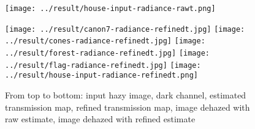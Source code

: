 \documentclass{article}
\begin{document}
\begin{figure}[H]
\begin{minipage}[b]{\linewidth}
        \texttt{[image: ../result/house-input-radiance-rawt.png]}
    \end{minipage}
    \begin{minipage}[b]{\linewidth}
        \centering
        \texttt{[image: ../result/canon7-radiance-refinedt.jpg]}
        \texttt{[image: ../result/cones-radiance-refinedt.jpg]}
        \texttt{[image: ../result/forest-radiance-refinedt.jpg]}
        \texttt{[image: ../result/flag-radiance-refinedt.jpg]}
        \texttt{[image: ../result/house-input-radiance-refinedt.png]}
    \end{minipage}
    \caption{From top to bottom: input hazy image, dark channel, estimated transmission map, refined transmission map, image dehazed with raw estimate, image dehazed with refined estimate}
    \label{fig:result1}
\end{figure}
\end{document}
